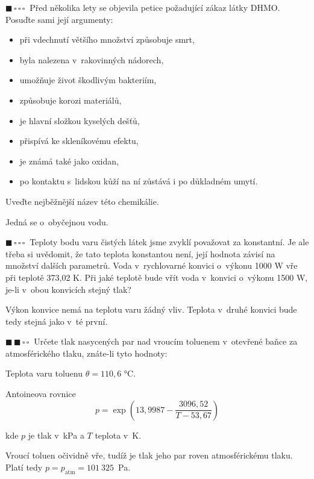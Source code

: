 \documentclass{book}
\newcommand{\jeden}{$\blacksquare \, \square \, \square \, \square \; \; $}
\newcommand{\dva}{$\blacksquare \, \blacksquare \, \square \, \square \; \; $}
\renewenvironment{quotation}{\par}{\par} %
\begin{document}
\begin{quotation}

\jeden Před několika lety se objevila petice požadující zákaz látky DHMO.
Posuďte sami její argumenty:
\begin{itemize}
\item při vdechnutí většího množství způsobuje smrt,
\item byla nalezena v~rakovinných nádorech, 
\item umožňuje život škodlivým bakteriím, 
\item způsobuje korozi materiálů, 
\item je hlavní složkou kyselých dešťů, 
\item přispívá ke skleníkovému efektu,
\item je známá také jako oxidan, 
\item po kontaktu s~lidskou kůží na ní zůstává i po důkladném umytí.
\end{itemize}
Uveďte nejběžnější název této chemikálie. 
\end{quotation} \dotfill \par 
Jedná se o~obyčejnou vodu.

\hrulefill %
\begin{quotation}
\jeden Teploty bodu varu čistých látek jsme zvyklí považovat za konstantní.
Je ale třeba si uvědomit, že tato teplota konstantou není, její hodnota
závisí na množství dalších parametrů. Voda v~rychlovarné konvici o~výkonu 1000 W vře při teplotě 373,02 K. Při jaké teplotě bude vřít
voda v~konvici o~výkonu 1500 W, je-li v~obou konvicích stejný tlak? 
\end{quotation} \dotfill \par 
Výkon konvice nemá na teplotu varu žádný vliv. Teplota v~druhé konvici
bude tedy stejná jako v~té první.

\hrulefill %
\begin{quotation}
\dva Určete tlak nasycených par nad vroucím toluenem v~otevřené baňce
za atmosférického tlaku, znáte-li tyto hodnoty:

Teplota varu toluenu $\theta=110,6$ °C.

Antoineova rovnice 
\[
p=\exp\left(13,9987-\frac{3096,52}{T-53,67}\right)
\]

kde $p$ je tlak v~kPa a $T$ teplota v~K.
\end{quotation} \dotfill \par 
Vroucí toluen očividně vře, tudíž je tlak jeho par roven atmosférickému tlaku. Platí tedy $p=p_{\mathrm{atm}}=101~325$~Pa.
\end{document}
